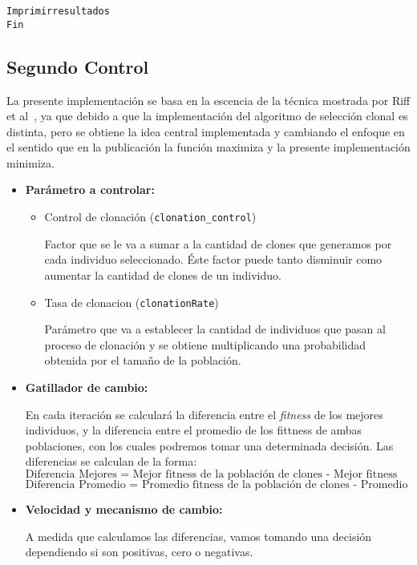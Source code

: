 \begin{itemize}
\begin{alltt}
    Imprimir resultados
    Fin
\end{alltt}

\end{itemize}
\newpage
\subsection{Segundo Control}

La presente implementación se basa en la escencia de la técnica
mostrada por Riff et al~\cite{riff}, ya que debido a que la implementación
del algoritmo de selección clonal es distinta, pero se obtiene
la idea central implementada y cambiando el enfoque en el sentido
que en la publicación la función maximiza y la presente implementación
minimiza.

\begin{itemize}
\item \textbf{Parámetro a controlar:}
\begin{itemize}
	\item Control de clonación (\texttt{clonation\_control}) 

		Factor que se le va a sumar a la cantidad de clones que generamos por cada
		individuo seleccionado. Éste factor puede tanto disminuir como aumentar la cantidad
		de clones de un individuo.		
	\item Tasa de clonacion (\texttt{clonationRate}) \blue{[0,1]}

		Parámetro que va a establecer la cantidad de individuos que pasan al proceso
		de clonación y se obtiene multiplicando una probabilidad obtenida por el tamaño de la población.

\end{itemize}
\item \textbf{Gatillador de cambio:} 

	En cada iteración se calculará la diferencia entre el \emph{fitness} de los mejores
	individuos, y la diferencia entre el promedio de los fittness de ambas poblaciones,
	con los cuales podremos tomar una determinada decisión.
	Las diferencias se calculan de la forma:
	$$\text{Diferencia Mejores =  Mejor fitness de la población de clones - Mejor fitness de la población actual}$$
	$$\text{Diferencia Promedio =  Promedio fitness de la población de clones - Promedio fitness de la población actual}$$

\item \textbf{Velocidad y mecanismo de cambio:}

	A medida que calculamos las diferencias, vamos tomando una decisión dependiendo si
	son positivas, cero o negativas.


\end{itemize}
